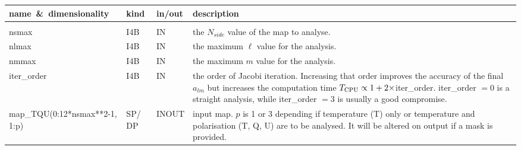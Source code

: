 \begin{arguments}
{
\begin{tabular}{p{0.4\hsize} p{0.05\hsize} p{0.05\hsize} p{0.40\hsize}} \hline  
\textbf{name~\&~dimensionality} & \textbf{kind} & \textbf{in/out} & \textbf{description} \\ \hline
                   &   &   &                           \\ %
nsmax & I4B & IN & the $N_{side}$ value of the map to analyse. \\
nlmax & I4B & IN & the maximum $\ell$ value for the analysis. \\
nmmax & I4B & IN & the maximum $m$ value for the analysis. \\
%
iter\_order & I4B & IN & the order of Jacobi iteration. Increasing that order
improves the accuracy of the final $a_{lm}$ but increases the computation time $
T_{\rm CPU} \propto 1 + 2 \times $iter\_order. 
iter\_order $=0$ is a straight analysis, while iter\_order $=3$ is usually a
good compromise. \\
%
map\_TQU(0:12*nsmax**2-1, 1:p) & SP/ DP & INOUT & input map. $p$ is 1 or 3
depending if temperature (T) only or temperature and polarisation (T, Q, U) are
to be analysed. It will be altered on output if a mask is provided.\\
\end{tabular}

}
\end{arguments}
